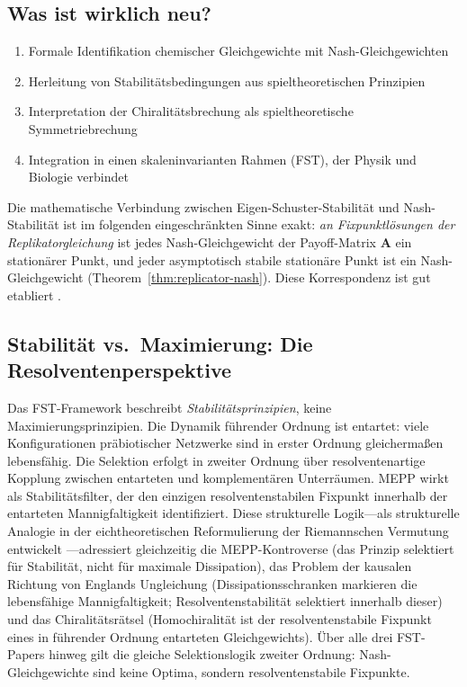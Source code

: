 \documentclass[12pt,a4paper]{article}
\theoremstyle{remark}
\begin{document}
\subsection{Was ist wirklich neu?}

\begin{enumerate}
    \item Formale Identifikation chemischer Gleichgewichte mit Nash-Gleichgewichten
    \item Herleitung von Stabilit\"atsbedingungen aus spieltheoretischen Prinzipien
    \item Interpretation der Chiralit\"atsbrechung als spieltheoretische Symmetriebrechung
    \item Integration in einen skaleninvarianten Rahmen (FST), der Physik und Biologie verbindet
\end{enumerate}

Die mathematische Verbindung zwischen Eigen-Schuster-Stabilit\"at und Nash-Stabilit\"at ist im folgenden eingeschr\"ankten Sinne exakt: \emph{an Fixpunktl\"osungen der Replikatorgleichung} ist jedes Nash-Gleichgewicht der Payoff-Matrix $\mathbf{A}$ ein station\"arer Punkt, und jeder asymptotisch stabile station\"are Punkt ist ein Nash-Gleichgewicht (Theorem~\ref{thm:replicator-nash}). Diese Korrespondenz ist gut etabliert \citep{HofbauerSigmund2003}.

\subsection{Stabilit\"at vs.\ Maximierung: Die Resolventenperspektive}

Das FST-Framework beschreibt \emph{Stabilit\"atsprinzipien}, keine Maximierungsprinzipien. Die Dynamik f\"uhrender Ordnung ist entartet: viele Konfigurationen pr\"abiotischer Netzwerke sind in erster Ordnung gleicherma\ss{}en lebensfähig. Die Selektion erfolgt in zweiter Ordnung \"uber resolventenartige Kopplung zwischen entarteten und komplement\"aren Unterr\"aumen. MEPP wirkt als Stabilit\"atsfilter, der den einzigen resolventenstabilen Fixpunkt innerhalb der entarteten Mannigfaltigkeit identifiziert. Diese strukturelle Logik---als strukturelle Analogie in der eichtheoretischen Reformulierung der Riemannschen Vermutung entwickelt \citep{GeigerRH2026b}---adressiert gleichzeitig die MEPP-Kontroverse (das Prinzip selektiert f\"ur Stabilit\"at, nicht f\"ur maximale Dissipation), das Problem der kausalen Richtung von Englands Ungleichung (Dissipationsschranken markieren die lebensfähige Mannigfaltigkeit; Resolventenstabilit\"at selektiert innerhalb dieser) und das Chiralit\"atsr\"atsel (Homochiralit\"at ist der resolventenstabile Fixpunkt eines in f\"uhrender Ordnung entarteten Gleichgewichts). \"Uber alle drei FST-Papers hinweg gilt die gleiche Selektionslogik zweiter Ordnung: Nash-Gleichgewichte sind keine Optima, sondern resolventenstabile Fixpunkte.
\end{document}
